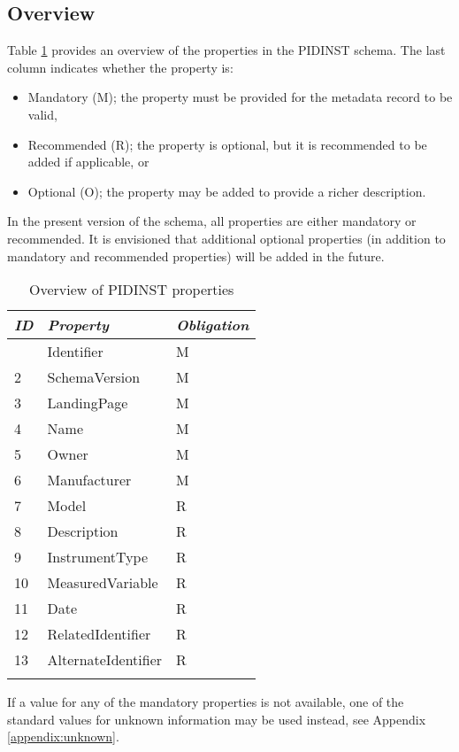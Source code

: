 \documentclass[titlepage=true,twoside=false,DIV=13]{scrartcl}
\begin{document}
\subsection{Overview}

Table \ref{tab:schema:propoverview} provides an overview of the
properties in the PIDINST schema.  The last column indicates whether
the property is:
\begin{itemize}
\item Mandatory (M); the property must be provided for the metadata
  record to be valid,
\item Recommended (R); the property is optional, but it is recommended
  to be added if applicable, or
\item Optional (O); the property may be added to provide a richer
  description.
\end{itemize}
In the present version of the schema, all properties are either
mandatory or recommended.  It is envisioned that additional optional
properties (in addition to mandatory and recommended properties) will
be added in the future.

\begin{longtable}{|l|l|l|}
  \hline
  \emph{ID} & \emph{Property} & \emph{Obligation} \\
  \hline \endhead
  \hline \endfoot\endlastfoot
  1     & Identifier          & M \\
  2     & SchemaVersion       & M \\
  3     & LandingPage         & M \\
  4     & Name                & M \\
  5     & Owner               & M \\
  6     & Manufacturer        & M \\
  7     & Model               & R \\
  8     & Description         & R \\
  9     & InstrumentType      & R \\
  10    & MeasuredVariable    & R \\
  11    & Date                & R \\
  12    & RelatedIdentifier   & R \\
  13    & AlternateIdentifier & R \\
  \hline
  \caption{Overview of PIDINST properties}
  \label{tab:schema:propoverview}
\end{longtable}

If a value for any of the mandatory properties is not available, one
of the standard values for unknown information may be used instead,
see Appendix \ref{appendix:unknown}.
\end{document}
